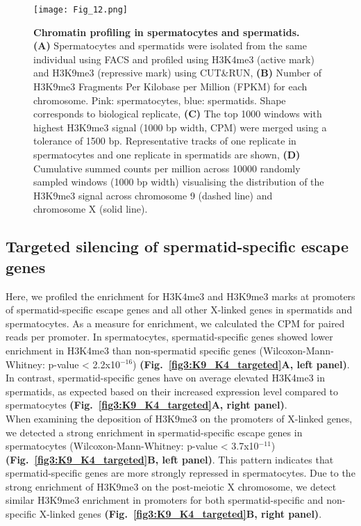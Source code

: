 \begin{figure}[!h]
\centering
\texttt{[image: Fig\_12.png]}
\caption[Chromatin profiling in spermatocytes and spermatids]{\textbf{Chromatin profiling in spermatocytes and spermatids.} \\
\textbf{(A)} Spermatocytes and spermatids were isolated from the same individual using FACS and profiled using H3K4me3 (active mark) and H3K9me3 (repressive mark) using CUT\&{}RUN, 
\textbf{(B)} Number of H3K9me3 Fragments Per Kilobase per Million (FPKM) for each chromosome. Pink: spermatocytes, blue: spermatids. Shape corresponds to biological replicate, 
\textbf{(C)} The top 1000 windows with highest H3K9me3 signal (1000 bp width, CPM) were merged using a tolerance of 1500 bp. Representative tracks of one replicate in spermatocytes and one replicate in spermatids are shown, 
\textbf{(D)} Cumulative summed counts per million across 10000 randomly sampled windows (1000 bp width) visualising the distribution of the H3K9me3 signal across chromosome 9 (dashed line) and chromosome X (solid line).}
\label{fig3:K9_global}
\end{figure}

\newpage

\subsection{Targeted silencing of spermatid-specific escape genes}

Here, we profiled the enrichment for H3K4me3 and H3K9me3 marks at promoters of spermatid-specific escape genes and all other X-linked genes in spermatids and spermatocytes. 
As a measure for enrichment, we calculated the \gls{CPM} for paired reads per promoter. In spermatocytes, spermatid-specific genes showed lower enrichment in H3K4me3 than non-spermatid specific genes (Wilcoxon-Mann-Whitney: p-value < 2.2x10$^{-16}$) \textbf{(Fig.~\ref{fig3:K9_K4_targeted}A, left panel)}. 
In contrast, spermatid-specific genes have on average elevated H3K4me3 in spermatids, as expected based on their increased expression level compared to spermatocytes \textbf{(Fig.~\ref{fig3:K9_K4_targeted}A, right panel)}. \\


When examining the deposition of H3K9me3 on the promoters of X-linked genes, we detected a strong enrichment in spermatid-specific escape genes in spermatocytes (Wilcoxon-Mann-Whitney: p-value < 3.7x10$^{-11}$) \textbf{(Fig.~\ref{fig3:K9_K4_targeted}B, left panel)}. 
This pattern indicates that spermatid-specific genes are more strongly repressed in spermatocytes. 
Due to the strong enrichment of H3K9me3 on the post-meiotic X chromosome, we detect similar H3K9me3 enrichment in promoters for both spermatid-specific and non-specific X-linked genes \textbf{(Fig.~\ref{fig3:K9_K4_targeted}B, right panel)}.\\

